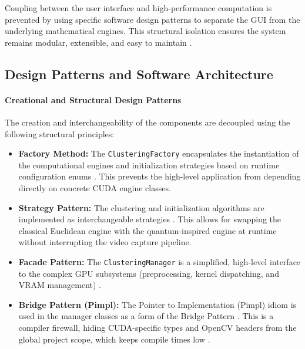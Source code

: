 Coupling between the user interface and high-performance computation is prevented by using specific software design patterns to separate the GUI from the underlying mathematical engines. This structural isolation ensures the system remains modular, extensible, and easy to maintain \cite{gamma1995design}.

\subsection{Design Patterns and Software Architecture}

\paragraph{Creational and Structural Design Patterns}
The creation and interchangeability of the components are decoupled using the following structural principles:
\begin{itemize}
    \item \textbf{Factory Method:} The \texttt{ClusteringFactory} encapsulates the instantiation of the computational engines and initialization strategies based on runtime configuration enums \cite{gamma1995design}. This prevents the high-level application from depending directly on concrete CUDA engine classes.
    \item \textbf{Strategy Pattern:} The clustering and initialization algorithms are implemented as interchangeable strategies \cite{gamma1995design}. This allows for swapping the classical Euclidean engine with the quantum-inspired engine at runtime without interrupting the video capture pipeline.
    \item \textbf{Facade Pattern:} The \texttt{ClusteringManager} is a simplified, high-level interface to the complex GPU subsystems (preprocessing, kernel dispatching, and VRAM management) \cite{gamma1995design}.
    \item \textbf{Bridge Pattern (Pimpl):} The Pointer to Implementation (Pimpl) idiom is used in the manager classes as a form of the Bridge Pattern \cite{gamma1995design}. This is a compiler firewall, hiding CUDA-specific types and OpenCV headers from the global project scope, which keeps compile times low \cite{stroustrup2022tour}.
\end{itemize}

